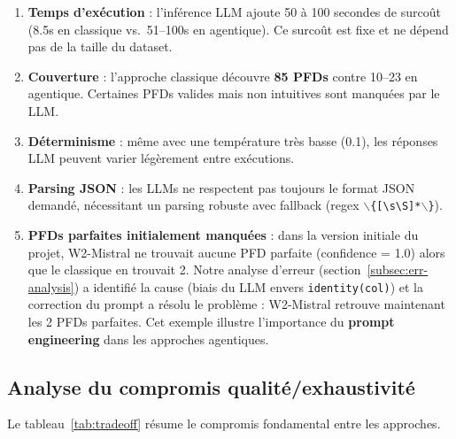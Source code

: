 \documentclass[12pt,a4paper]{article}
\begin{document}
\begin{enumerate}
    \item \textbf{Temps d'ex\'{e}cution} : l'inf\'{e}rence LLM ajoute 50 \`{a} 100 secondes de surco\^{u}t (8.5s en classique vs.\ 51--100s en agentique). Ce surco\^{u}t est fixe et ne d\'{e}pend pas de la taille du dataset.

    \item \textbf{Couverture} : l'approche classique d\'{e}couvre \textbf{85 PFDs} contre 10--23 en agentique. Certaines PFDs valides mais non intuitives sont manqu\'{e}es par le LLM.

    \item \textbf{D\'{e}terminisme} : m\^{e}me avec une temp\'{e}rature tr\`{e}s basse (0.1), les r\'{e}ponses LLM peuvent varier l\'{e}g\`{e}rement entre ex\'{e}cutions.

    \item \textbf{Parsing JSON} : les LLMs ne respectent pas toujours le format JSON demand\'{e}, n\'{e}cessitant un parsing robuste avec fallback (regex \texttt{$\backslash$\{[\textbackslash s\textbackslash S]*$\backslash$\}}).

    \item \textbf{PFDs parfaites initialement manqu\'{e}es} : dans la version initiale du projet, W2-Mistral ne trouvait aucune PFD parfaite (confidence = 1.0) alors que le classique en trouvait 2. Notre analyse d'erreur (section~\ref{subsec:err-analysis}) a identifi\'{e} la cause (biais du LLM envers \texttt{identity(col)}) et la correction du prompt a r\'{e}solu le probl\`{e}me : W2-Mistral retrouve maintenant les 2 PFDs parfaites. Cet exemple illustre l'importance du \textbf{prompt engineering} dans les approches agentiques.
\end{enumerate}

\subsection{Analyse du compromis qualit\'{e}/exhaustivit\'{e}}

Le tableau~\ref{tab:tradeoff} r\'{e}sume le compromis fondamental entre les approches.
\end{document}
